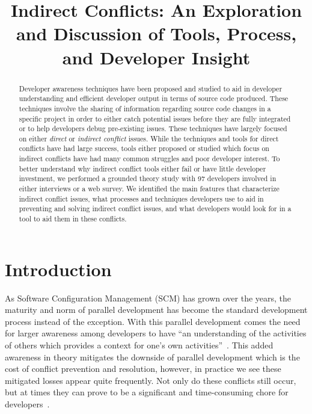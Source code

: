 \documentclass[conference]{IEEEtran}
\begin{document}
\title{Indirect Conflicts: An Exploration and Discussion of Tools, Process, and Developer Insight}

\author{
}

\maketitle

\begin{abstract}

Developer awareness techniques have been proposed and studied to aid in developer
understanding and  efficient developer output in terms of source code produced. These techniques
involve the sharing of information regarding source code changes in a specific project in order
to either catch potential issues before they are fully integrated or to help developers debug
pre-existing issues. These techniques have largely focused on either \textit{direct} or 
\textit{indirect conflict} issues. While the techniques and tools for direct conflicts have had
large success, tools either proposed or studied which focus on indirect conflicts have had many common
struggles and poor developer interest. To better understand why indirect conflict tools either fail or have little
developer investment, we performed a grounded theory study with 97 developers involved in either
interviews or a web survey. We identified the main features that characterize indirect conflict issues,
what processes and techniques developers use to aid in preventing and solving indirect conflict issues,
and what developers would look for in a tool to aid them in these conflicts.

\end{abstract}

\section{Introduction}
\label{sec:intro}

As Software Configuration Management (SCM) has grown over the years, the maturity and norm of parallel 
development has become the standard development process instead of the exception. With this parallel development
comes the need for larger awareness among developers to have ``an understanding of the activities of others
which provides a context for one's own activities''~\cite{Dourish:1992:ACS}. This added awareness in theory
mitigates the downside of parallel development which is the cost of conflict prevention and resolution, however,
in practice we see these mitigated losses appear quite frequently. Not only do these conflicts still occur,
but at times they can prove to be a significant and time-consuming chore for developers~\cite{Perry:2001:PCL}.
\end{document}
